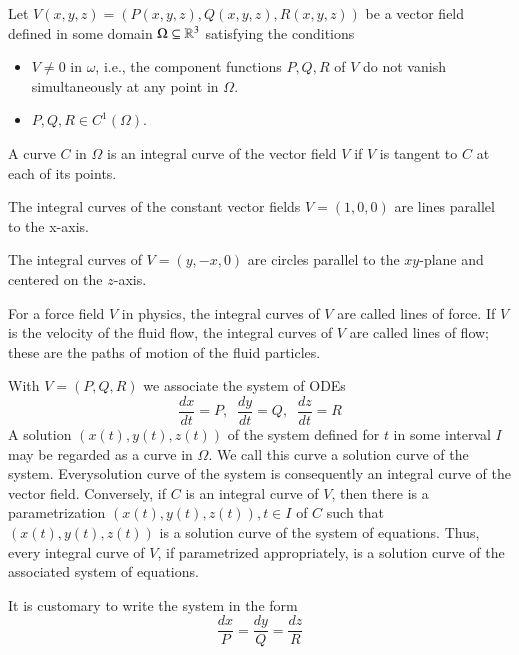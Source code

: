     
    Let $V(x,y,z) = (P(x,y,z),Q(x,y,z),R(x,y,z))$ be a vector field defined in some domain $\Omega \subseteq \mathbb R^3$ satisfying the conditions \begin{itemize}
        \item $V\neq 0$ in $\omega$, i.e., the component functions $P,Q,R$ of $V$ do not vanish simultaneously at any point in $\Omega$.
        \item $P,Q,R \in C^1(\Omega)$.
    \end{itemize}

    \begin{definition}
        A curve $C$ in $\Omega$ is an integral curve of the vector field $V$ if $V$ is tangent to $C$ at each of its points.
    \end{definition}

    \begin{example}
        The integral curves of the constant vector fields $V = (1,0,0)$ are lines parallel to the x-axis.
    \end{example}

    \begin{example}
        The integral curves of $V = (y,-x,0)$ are circles parallel to the $xy$-plane and centered on the $z$-axis.
    \end{example}

    For a force field $V$ in physics, the integral curves of $V$ are called lines of force. If $V$ is the velocity of the fluid flow, the integral curves of $V$ are called lines of flow; these are the paths of motion of the fluid particles.

    With $V = (P,Q,R)$ we associate the system of ODEs \begin{equation*}
        \frac{dx}{dt} = P,\;\;\frac{dy}{dt} = Q,\;\;\frac{dz}{dt} = R
    \end{equation*}
    A solution $(x(t),y(t),z(t))$ of the system defined for $t$ in some interval $I$ may be regarded as a curve in $\Omega$. We call this curve a solution curve of the system. Everysolution curve of the system is consequently an integral curve of the vector field. Conversely, if $C$ is an integral curve of $V$, then there is a parametrization $(x(t),y(t),z(t)),t \in I$ of $C$ such that $(x(t),y(t),z(t))$ is a solution curve of the system of equations. Thus, every integral curve of $V$, if parametrized appropriately, is a solution curve of the associated system of equations. 

    It is customary to write the system in the form \begin{equation*}
        \frac{dx}{P} = \frac{dy}{Q} = \frac{dz}{R}
    \end{equation*}

